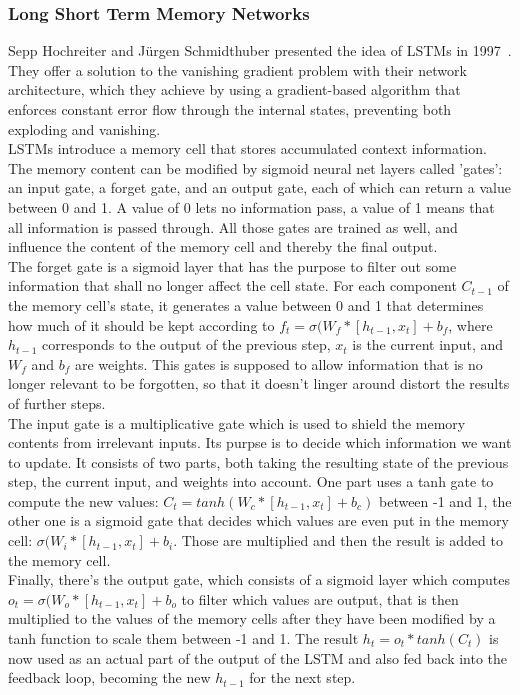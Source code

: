 \documentclass[
	a4paper,
	pagesize,
	pdftex,
	12pt,
	twoside, %
	BCOR=5mm, %
	ngerman,
	fleqn,
	final,
	]{scrartcl}
\begin{document}
\subsubsection{Long Short Term Memory Networks}\label{LSTM}
Sepp Hochreiter and Jürgen Schmidthuber presented the idea of LSTMs in 1997~\cite{Hochreiter.1997}. They offer a solution to the vanishing gradient problem with their network architecture, which they achieve by using a gradient-based algorithm that enforces constant error flow through the internal states, preventing both exploding and vanishing.\\
LSTMs introduce a memory cell that stores accumulated context information. The memory content can be modified by sigmoid neural net layers called 'gates': an input gate, a forget gate, and an output gate, each of which can return a value between 0 and 1. A value of 0 lets no information pass, a value of 1 means that all information is passed through. All those gates are trained as well, and influence the content of the memory cell and thereby the final output.\\
The forget gate is a sigmoid layer that has the purpose to filter out some information that shall no longer affect the cell state. For each component $C_{t-1}$ of the memory cell's state, it generates a value between 0 and 1 that determines how much of it should be kept according to $f_t = \sigma (W_f * [h_{t-1}, x_t] + b_f$, where $h_{t-1}$ corresponds to the output of the previous step, $x_t$ is the current input, and $W_f$ and $b_f$ are weights. This gates is supposed to allow information that is no longer relevant to be forgotten, so that it doesn't linger around distort the results of further steps.\\
The input gate is a multiplicative gate which is used to shield the memory contents from irrelevant inputs. Its purpse is to decide which information we want to update. It consists of two parts, both taking the resulting state of the previous step, the current input, and weights into account. One part uses a tanh gate to compute the new values: $C_t = tanh (W_c * [h_{t-1} , x_t] + b_c)$ between -1 and 1, the other one is a sigmoid gate that decides which values are even put in the memory cell: $\sigma (W_i * [h_{t-1}, x_t] + b_i$. Those are multiplied and then the result is added to the memory cell.\\
Finally, there's the output gate, which consists of a sigmoid layer which computes $o_t = \sigma (W_o * [h_{t-1}, x_t] + b_o$ to filter which values are output, that is then multiplied to the values of the memory cells after they have been modified by a tanh function to scale them between -1 and 1. The result $h_t = o_t * tanh(C_t)$ is now used as an actual part of the output of the LSTM and also fed back into the feedback loop, becoming the new $h_{t-1}$ for the next step.\\
\end{document}
